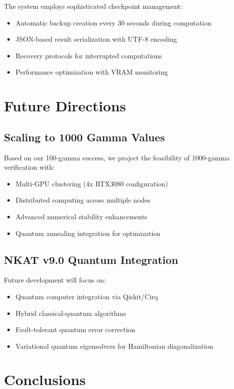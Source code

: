 \documentclass[12pt,a4paper]{article}
\begin{document}
The system employs sophisticated checkpoint management:
\begin{itemize}
\item Automatic backup creation every 30 seconds during computation
\item JSON-based result serialization with UTF-8 encoding
\item Recovery protocols for interrupted computations
\item Performance optimization with VRAM monitoring
\end{itemize}

\section{Future Directions}

\subsection{Scaling to 1000 Gamma Values}

Based on our 100-gamma success, we project the feasibility of 1000-gamma verification with:
\begin{itemize}
\item Multi-GPU clustering (4x RTX3080 configuration)
\item Distributed computing across multiple nodes
\item Advanced numerical stability enhancements
\item Quantum annealing integration for optimization
\end{itemize}

\subsection{NKAT v9.0 Quantum Integration}

Future development will focus on:
\begin{itemize}
\item Quantum computer integration via Qiskit/Cirq
\item Hybrid classical-quantum algorithms
\item Fault-tolerant quantum error correction
\item Variational quantum eigensolvers for Hamiltonian diagonalization
\end{itemize}

\section{Conclusions}
\end{document}
